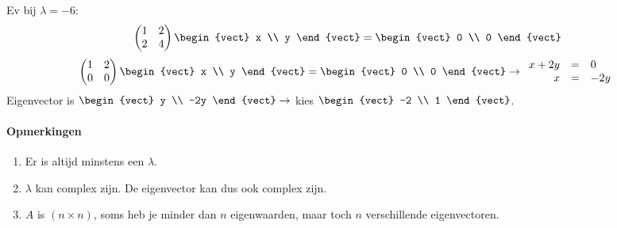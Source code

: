 Ev bij $\lambda = -6$:
\[ \begin{pmatrix*}[r] 1 & 2 \\ 2 & 4 \end{pmatrix*} \begin{vect} x \\ y \end{vect} = \begin{vect} 0 \\ 0 \end{vect} \]
\[ \begin{pmatrix*}[r] 1 & 2 \\ 0 & 0 \end{pmatrix*} \begin{vect} x \\ y \end{vect} = \begin{vect} 0 \\ 0 \end{vect} \to \begin{array}{rcl}
	x + 2y &=& 0 \\
	x &=& -2y
\end{array} \]
Eigenvector is $\begin{vect} y \\ -2y \end{vect} \to$ kies $\begin{vect} -2 \\ 1 \end{vect}$.

\paragraph{Opmerkingen}
\begin{enumerate}
	\item Er is altijd minstens een $\lambda$.
	\item $\lambda$ kan complex zijn. De eigenvector kan dus ook complex zijn.
	\item $A$ is $(n \times n)$, soms heb je minder dan $n$ eigenwaarden, maar toch $n$ verschillende eigenvectoren.
\end{enumerate}


